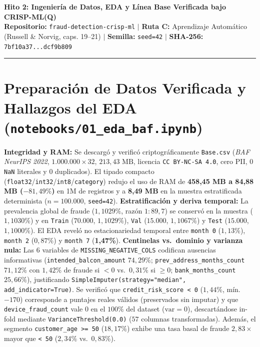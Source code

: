 \documentclass[9pt,letterpaper]{article}
\begin{document}
\begin{center}
    {\large \textbf{Hito 2: Ingeniería de Datos, EDA y Línea Base Verificada bajo CRISP-ML(Q)}}\\[1.5pt]
    {\scriptsize \textbf{Repositorio:} \texttt{fraud-detection-crisp-ml} $|$ \textbf{Ruta C:} Aprendizaje Automático (Russell \& Norvig, caps. 19--21) $|$ \textbf{Semilla:} \texttt{seed=42} $|$ \textbf{SHA-256:} \texttt{7bf10a37...dcf9b809}}
\end{center}
\vspace{-5pt}
\hrule
\vspace{2.5pt}

\section{Preparación de Datos Verificada y Hallazgos del EDA (\texttt{notebooks/01\_eda\_baf.ipynb})}
\textbf{Integridad y RAM:} Se descargó y verificó criptográficamente \texttt{Base.csv} (\textit{BAF NeurIPS 2022}, $1.000.000 \times 32$, $213,43\text{ MB}$, licencia \texttt{CC BY-NC-SA 4.0}, cero PII, $0$ \texttt{NaN} literales y $0$ duplicados). El tipado compacto (\texttt{float32}/\texttt{int32}/\texttt{int8}/\texttt{category}) redujo el uso de RAM de \textbf{458,45 MB a 84,88 MB ($-81,49\%$)} en 1M de registros y a \textbf{8,49 MB} en la muestra estratificada determinista ($n=100.000$, \texttt{seed=42}). \textbf{Estratificación y deriva temporal:} La prevalencia global de fraude ($1,1029\%$, razón $1\!:\!89,7$) se conservó en la muestra ($1,1030\%$) y en \texttt{Train} ($70.000$, $1,1029\%$), \texttt{Val} ($15.000$, $1,1067\%$) y \texttt{Test} ($15.000$, $1,1000\%$). El EDA reveló no estacionariedad temporal entre \texttt{month 0} ($1,13\%$), \texttt{month 2} ($0,87\%$) y \texttt{month 7} (\textbf{1,47\%}). \textbf{Centinelas vs.\ dominio y varianza nula:} Las 6 variables de \texttt{MISSING\_NEGATIVE\_COLS} codifican ausencias informativas (\texttt{intended\_balcon\_amount} $74,29\%$; \texttt{prev\_address\_months\_count} $71,12\%$ con $1,42\%$ de fraude si $<0$ vs.\ $0,31\%$ si $\ge 0$; \texttt{bank\_months\_count} $25,66\%$), justificando \texttt{SimpleImputer(strategy="median", add\_indicator=True)}. Se verificó que \texttt{credit\_risk\_score < 0} ($1,44\%$, mín.\ $-170$) corresponde a puntajes reales válidos (preservados sin imputar) y que \texttt{device\_fraud\_count} vale $0$ en el $100\%$ del dataset ($\text{var}=0$), descartándose in-fold mediante \texttt{VarianceThreshold(0.0)} ($57$ columnas transformadas). Además, el segmento \texttt{customer\_age >= 50} ($18,17\%$) exhibe una tasa basal de fraude $2,83\times$ mayor que \texttt{< 50} ($2,34\%$ vs.\ $0,83\%$).
\end{document}

